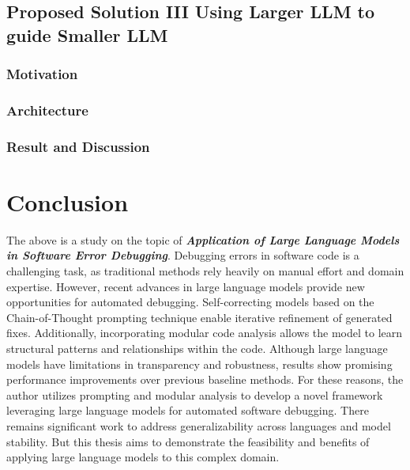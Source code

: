 \documentclass[a4paper,oneside]{book}
\begin{document}
\section{Proposed Solution III\: Using Larger LLM to guide Smaller LLM}
\subsection{Motivation}
\subsection{Architecture}
\subsection{Result and Discussion}

\chapter{Conclusion}
The above is a study on the topic of \textbf{\textit{Application of Large Language Models in Software Error Debugging}}. Debugging errors in software code is a challenging task, as traditional methods rely heavily on manual effort and domain expertise. However, recent advances in large language models provide new opportunities for automated debugging. Self-correcting models based on the Chain-of-Thought prompting technique enable iterative refinement of generated fixes. Additionally, incorporating modular code analysis allows the model to learn structural patterns and relationships within the code. Although large language models have limitations in transparency and robustness, results show promising performance improvements over previous baseline methods. For these reasons, the author utilizes prompting and modular analysis to develop a novel framework leveraging large language models for automated software debugging. There remains significant work to address generalizability across languages and model stability. But this thesis aims to demonstrate the feasibility and benefits of applying large language models to this complex domain.

\newpage
\renewcommand{\bibname}{References}

\end{document}
